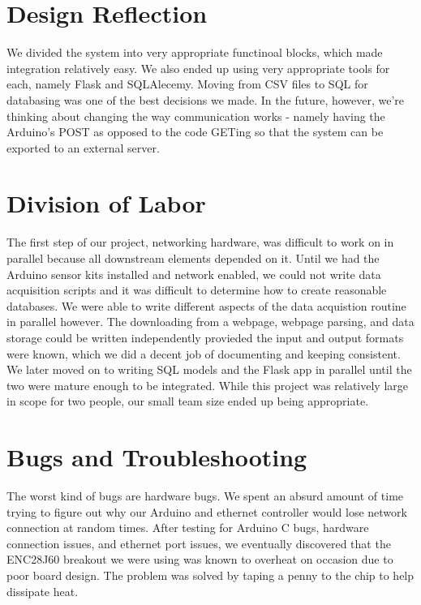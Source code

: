\documentclass{article}
\begin{document}
\section*{Design Reflection}
\par We divided the system into very appropriate functinoal blocks, which made integration relatively easy.  We also ended up using very appropriate tools for each, namely Flask and SQLAlecemy.  Moving from CSV files to SQL for databasing was one of the best decisions we made.  In the future, however, we're thinking about changing the way communication works - namely having the Arduino's POST as opposed to the code GETing so that the system can be exported to an external server.

\section*{Division of Labor}
\par The first step of our project, networking hardware, was difficult to work on in parallel because all downstream elements depended on it. Until we had the Arduino sensor kits installed and network enabled, we could not write data acquisition scripts and it was difficult to determine how to create reasonable databases. We were able to write different aspects of the data acquistion routine in parallel however. The downloading from a webpage, webpage parsing, and data storage could be written independently provieded the input and output formats were known, which we did a decent job of documenting and keeping consistent. We later moved on to writing SQL models and the Flask app in parallel until the two were mature enough to be integrated. While this project was relatively large in scope for two people, our small team size ended up being appropriate.

\section*{Bugs and Troubleshooting}
\par The worst kind of bugs are hardware bugs. We spent an absurd amount of time trying to figure out why our Arduino and ethernet controller would lose network connection at random times. After testing for Arduino C bugs, hardware connection issues, and ethernet port issues, we eventually discovered that the ENC28J60 breakout we were using was known to overheat on occasion due to poor board design. The problem was solved by taping a penny to the chip to help dissipate heat. 
\end{document}

